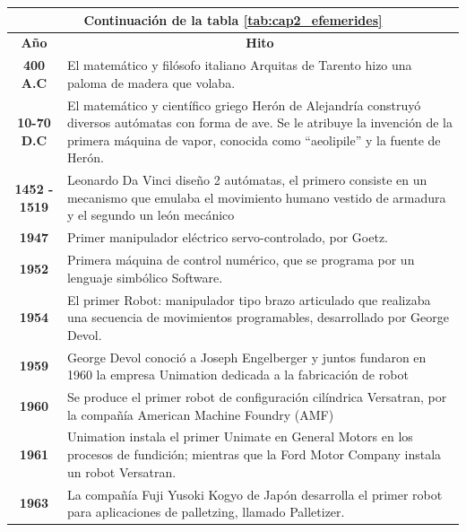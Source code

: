  \begin{longtable}[c]{c m{12cm}}
     \label{tab:cap2_efemerides}\\

     \endfirsthead
    
     \hline
     \multicolumn{2}{|c|}{Continuación de la tabla \eqref{tab:cap2_efemerides}}\\
     \hline
     \endhead
    
     \hline
     \endfoot
    
     \hline
     \textbf{Año}  & \multicolumn{1}{c}{\textbf{Hito}}  \\\hline\hline
     \textbf{400 A.C} & El matemático y filósofo italiano Arquitas de Tarento hizo una paloma de madera que volaba. \\ \hline
     \textbf{10-70 D.C} & El matemático y científico griego Herón de Alejandría construyó diversos autómatas con forma de ave. Se le atribuye la invención de la primera máquina de vapor, conocida como “aeolipile” y la fuente de Herón. \\ \hline
     \textbf{1452 - 1519} & Leonardo Da Vinci diseño 2 autómatas, el primero consiste en un mecanismo que emulaba el movimiento humano vestido de armadura y el segundo un león mecánico \\ \hline
     \textbf{1947} & Primer manipulador eléctrico servo-controlado, por Goetz. \\ \hline
     \textbf{1952} & Primera máquina de control numérico, que se programa por un lenguaje simbólico Software. \\ \hline
     \textbf{1954} & El primer Robot: manipulador tipo brazo articulado que realizaba una secuencia de movimientos programables, desarrollado por George Devol. \\ \hline
     \textbf{1959} & George Devol conoció a Joseph Engelberger y juntos fundaron en 1960 la empresa Unimation dedicada a la fabricación de robot \\ \hline
     \textbf{1960} & Se produce el primer robot de configuración cilíndrica Versatran, por la compañía American Machine Foundry (AMF) \\ \hline
     \textbf{1961} & Unimation instala el primer Unimate en General Motors en los procesos de fundición; mientras que la Ford Motor Company instala un robot Versatran. \\ \hline
     \textbf{1963} & La compañía Fuji Yusoki Kogyo de Japón desarrolla el primer robot para aplicaciones de palletzing, llamado Palletizer. \\ \hline

\end{longtable}
